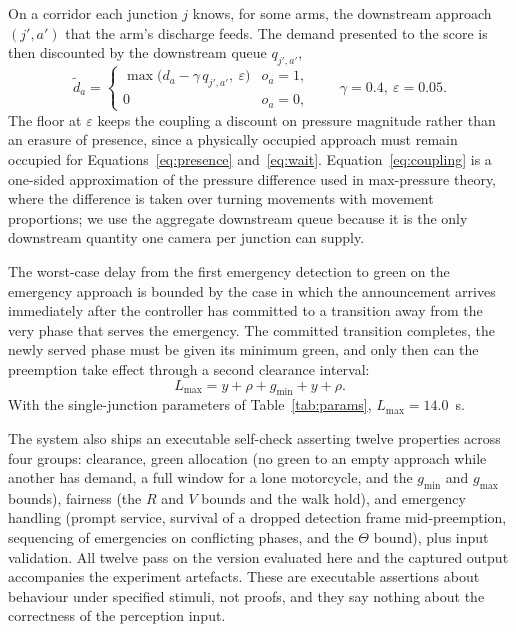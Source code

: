 \documentclass[journal]{IEEEtran}
\begin{document}
On a corridor each junction $j$ knows, for some arms, the downstream approach $(j', a')$ that the
arm's discharge feeds. The demand presented to the score is then discounted by the downstream queue
$q_{j',a'}$,
\begin{equation}
\tilde{d}_a =
\begin{cases}
\max\big(d_a - \gamma\, q_{j',a'},\ \varepsilon\big) & o_a = 1,\\
0 & o_a = 0,
\end{cases}
\qquad \gamma = 0.4,\ \varepsilon = 0.05 .
\label{eq:coupling}
\end{equation}
The floor at $\varepsilon$ keeps the coupling a discount on pressure magnitude rather than an erasure of
presence, since a physically occupied approach must remain occupied for Equations~\eqref{eq:presence}
and~\eqref{eq:wait}. Equation~\eqref{eq:coupling} is a one-sided approximation of the pressure difference
used in max-pressure theory, where the difference is taken over turning movements with movement
proportions; we use the aggregate downstream queue because it is the only downstream quantity one camera
per junction can supply.

The worst-case delay from the first emergency detection to green on the emergency approach is bounded
by the case in which the announcement arrives immediately after the controller has committed to a
transition away from the very phase that serves the emergency. The committed transition completes, the
newly served phase must be given its minimum green, and only then can the preemption take effect
through a second clearance interval:
\begin{equation}
L_{\max} = y + \rho + g_{\min} + y + \rho .
\label{eq:bound}
\end{equation}
With the single-junction parameters of Table~\ref{tab:params}, $L_{\max} = 14.0$~s.

The system also ships an executable self-check asserting twelve properties across four groups: clearance,
green allocation (no green to an empty approach while another has demand, a full window for a lone
motorcycle, and the $g_{\min}$ and $g_{\max}$ bounds), fairness (the $R$ and $V$ bounds and the walk hold),
and emergency handling (prompt service, survival of a dropped detection frame mid-preemption, sequencing
of emergencies on conflicting phases, and the $\Theta$ bound), plus input validation. All twelve pass on
the version evaluated here and the captured output accompanies the experiment artefacts. These are
executable assertions about behaviour under specified stimuli, not proofs, and they say nothing about the
correctness of the perception input.
\end{document}
